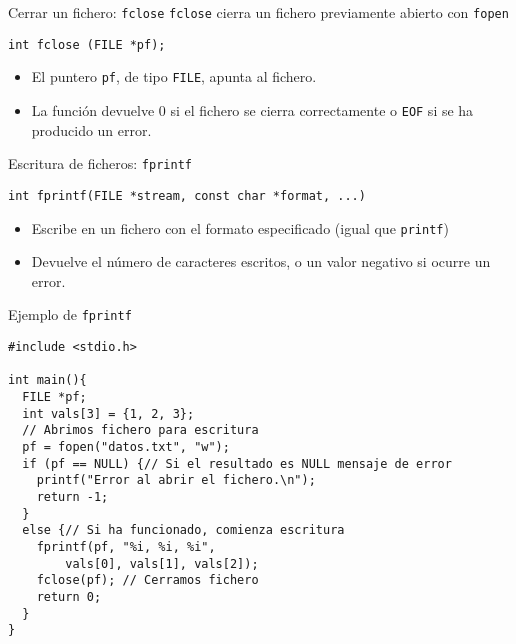 \documentclass[xcolor={usenames,svgnames,dvipsnames}, aspectratio=169]{beamer}
\begin{document}
\begin{frame}[label={sec:org4fa2a26},fragile]{Cerrar un fichero: \texttt{fclose}}
 \texttt{fclose} cierra un fichero previamente abierto con \texttt{fopen}

\lstset{language=C,label= ,caption= ,captionpos=b,numbers=none}
\begin{lstlisting}
int fclose (FILE *pf);
\end{lstlisting}

\begin{itemize}
\item El puntero \texttt{pf}, de tipo \texttt{FILE}, apunta al fichero.
\item La función devuelve 0 si el fichero se cierra correctamente o \texttt{EOF} si se ha producido un error.
\end{itemize}
\end{frame}

\begin{frame}[label={sec:org60b289b},fragile]{Escritura de ficheros: \texttt{fprintf}}
 \lstset{language=C,label= ,caption= ,captionpos=b,numbers=none}
\begin{lstlisting}
int fprintf(FILE *stream, const char *format, ...)
\end{lstlisting}

\begin{itemize}
\item Escribe en un fichero con el formato especificado (\alert{igual que \texttt{printf}})

\item Devuelve el número de caracteres escritos, o un valor negativo si ocurre un error.
\end{itemize}
\end{frame}


\begin{frame}[label={sec:orgc078ed1},fragile,plain]{Ejemplo de \texttt{fprintf}}
 \lstset{language=C,label= ,caption= ,captionpos=b,numbers=none}
\begin{lstlisting}
#include <stdio.h>

int main(){
  FILE *pf;
  int vals[3] = {1, 2, 3};
  // Abrimos fichero para escritura
  pf = fopen("datos.txt", "w");
  if (pf == NULL) {// Si el resultado es NULL mensaje de error 
    printf("Error al abrir el fichero.\n");
    return -1;
  }
  else {// Si ha funcionado, comienza escritura
    fprintf(pf, "%i, %i, %i",
	    vals[0], vals[1], vals[2]);
    fclose(pf); // Cerramos fichero
    return 0;
  }
}
\end{lstlisting}
\end{frame}
\end{document}
